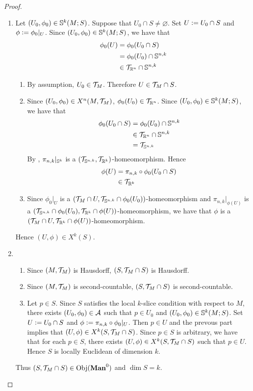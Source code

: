 \documentclass{book}
\begin{document}
	\begin{proof}\
		\begin{enumerate}
			\item 
			Let $(U_0, \phi_0) \in \S^k(M; S)$. Suppose that $U_0 \cap S \neq \varnothing$. Set $U \defeq U_0 \cap S$ and $\phi \defeq \phi_0|_U$. Since $(U_0, \phi_0) \in \S^k(M; S)$, we have that 
			\begin{align*}
				\phi_0(U)
				& = \phi_0(U_0 \cap S) \\
				& = \phi_0(U_0) \cap \S^{n,k} \\
				& \in \MT_{\R^n} \cap \S^{n,k}
			\end{align*}
			\begin{enumerate}
				\item By assumption, $U_0 \in \MT_M$. Therefore $U \in \MT_M \cap S$.
				\item Since $(U_0, \phi_0) \in X^n(M, \MT_M)$, $\phi_0(U_0) \in \MT_{\R^n}$. Since $(U_0, \phi_0) \in \S^k(M; S)$, we have that 
				\begin{align*}
					\phi_0(U_0 \cap S) 
					& = \phi_0(U_0) \cap \S^{n,k} \\
					& \in \MT_{\R^n} \cap \S^{n,k} \\
					& = \MT_{\S^{n,k}}
				\end{align*}
				By , $\pi_{n,k}|_{\S^k}$ is a $(\MT_{\S^{n,k}}, \MT_{\R^k})$-homeomorphism. Hence 
				\begin{align*}
					\phi(U)
					& = \pi_{n,k} \circ \phi_0 (U_0 \cap S) \\
					& \in \MT_{\R^k}
				\end{align*}
				\item Since $\phi_0|_U$ is a $(\MT_M \cap U, \MT_{\S^{n,k}} \cap \phi_0(U_0))$-homeomorphism and $\pi_{n,k}|_{\phi(U)}$ is a $(\MT_{\S^{n,k}} \cap \phi_0(U_0), \MT_{\R^k} \cap \phi(U))$-homeomorphism, we have that $\phi$ is a $(\MT_M \cap U, \MT_{\R^k} \cap \phi(U))$-homeomorphism. 
			\end{enumerate}
			Hence $(U, \phi) \in X^k(S)$.
			\item 
			\begin{enumerate}
				\item Since $(M, \MT_M)$ is Hausdorff, $(S, \MT_M \cap S)$ is Hausdorff.
				\item Since $(M, \MT_M)$ is second-countable, $(S, \MT_M \cap S)$ is second-countable.
				\item Let $p \in S$. Since $S$ satisfies the local $k$-slice condition with respect to $M$, there exists $(U_0, \phi_0) \in \MA$ such that $p \in U_0$ and $(U_0, \phi_0) \in \S^k(M; S)$. Set $U \defeq U_0 \cap S$ and $\phi \defeq \pi_{n,k} \circ \phi_0|_U$. Then $p \in U$ and the prevous part implies that $(U, \phi) \in X^k(S, \MT_M \cap S)$. Since $p \in S$ is arbitrary, we have that for each $p \in S$, there exists $(U, \phi) \in X^k(S, \MT_M \cap S)$ such that $p \in U$. Hence $S$ is locally Euclidean of dimension $k$. 
			\end{enumerate}
			Thus $(S, \MT_M \cap S) \in \Obj(\Man0)$ and $\dim S = k$.
		\end{enumerate}
	\end{proof}
\end{document}

